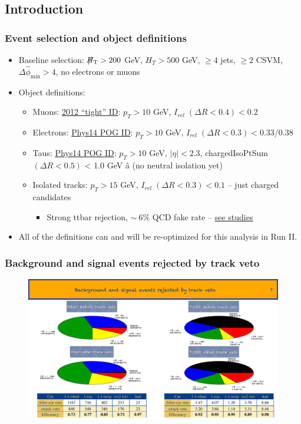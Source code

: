 \documentclass{beamer}
\begin{document}
\subsection{Introduction}
\begin{frame}
  \frametitle{Event selection and object definitions}
  \begin{itemize}
  \item Baseline selection: $\slash\mkern-12mu{H}_{\text{T}}>200$ GeV,
    $H_{T}>500$ GeV, $\geq4$ jets, $\geq2$ CSVM,
    $\Delta\hat{\phi}_{\mathrm{min}}>4$, no electrons or muons
  \item Object definitions:
    \begin{itemize}
    \item Muons: \href{https://twiki.cern.ch/twiki/bin/view/CMSPublic/SWGuideMuonId\#Tight\_Muon}{2012 ``tight'' ID}: $p_T > 10$ GeV, $I_{rel}\; (\Delta R<0.4) < 0.2$    
    \item Electrons: \href{https://twiki.cern.ch/twiki/bin/viewauth/CMS/CutBasedElectronIdentificationRun2\#CSA14\_selection\_conditions\_25ns}{Phys14 POG ID}:  $p_T > 10$ GeV, $I_{rel}\;
      (\Delta R<0.3) < 0.33 / 0.38$
    \item Taus: \href{https://indico.cern.ch/event/359233/contribution/4/material/slides/0.pdf}{Phys14 POG ID}: $p_T > 10$ GeV, $|\eta| < 2.3$,
      chargedIsoPtSum $(\Delta R<0.5)$ < 1.0 GeV â (no neutral isolation yet)
    \item Isolated tracks: $p_T > 15$ GeV, $I_{rel}\;(\Delta R<0.3) < 0.1$ -- just charged candidates
      \begin{itemize}
      \item Strong ttbar rejection, $\sim~6\%$ QCD fake rate -- \href{https://indico.cern.ch/event/334949/contribution/1/material/slides/0.pdf}{see studies}
      \end{itemize}

    \end{itemize}
  \item All of the definitions can and will be re-optimized for this
    analysis in Run II.
  \end{itemize}
\end{frame}

\begin{frame}
  \frametitle{Background and signal events rejected by track veto}
  \begin{figure}
    \includegraphics[width=\textwidth]{figures/jacks_Studies/rejection_slide}
  \end{figure}
\end{frame}
\end{document}
